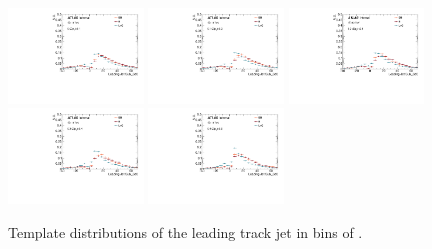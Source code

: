 \begin{figure}[htbp]
  \centering
 \includegraphics[width=0.32\textwidth]{figures/gbb/Sub_Sd0_Fits/Canv_FitTemplate_0-Zp_T-01_LpT_INF_SpT_INF_x.pdf}
 \includegraphics[width=0.32\textwidth]{figures/gbb/Sub_Sd0_Fits/Canv_FitTemplate_01-Zp_T-02_LpT_INF_SpT_INF_x.pdf}
 \includegraphics[width=0.32\textwidth]{figures/gbb/Sub_Sd0_Fits/Canv_FitTemplate_02-Zp_T-03_LpT_INF_SpT_INF_x.pdf}\\
 \includegraphics[width=0.32\textwidth]{figures/gbb/Sub_Sd0_Fits/Canv_FitTemplate_03-Zp_T-04_LpT_INF_SpT_INF_x.pdf}
 \includegraphics[width=0.32\textwidth]{figures/gbb/Sub_Sd0_Fits/Canv_FitTemplate_04-Zp_T-05_LpT_INF_SpT_INF_x.pdf}

\caption{Template \subsdzero distributions of the leading track jet in bins of \zpt. }
  \label{fig:ZpT-template-leading}
\end{figure}


